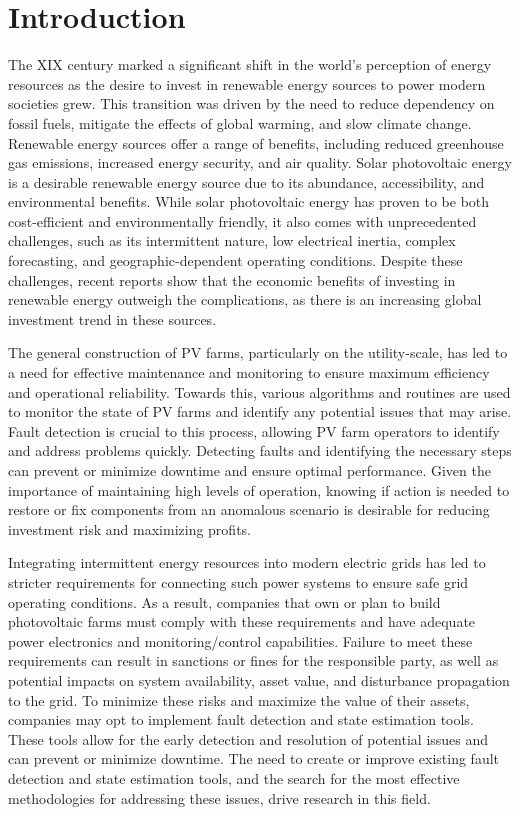 \chapter{Introduction} \label{chap:chap1}


The XIX century marked a significant shift in the world's perception of energy resources as the desire to invest in renewable energy sources to power modern societies grew. This transition was driven by the need to reduce dependency on fossil fuels, mitigate the effects of global warming, and slow climate change. Renewable energy sources offer a range of benefits, including reduced greenhouse gas emissions, increased energy security, and air quality. Solar photovoltaic energy is a desirable renewable energy source due to its abundance, accessibility, and environmental benefits. While solar photovoltaic energy has proven to be both cost-efficient and environmentally friendly, it also comes with unprecedented challenges, such as its intermittent nature, low electrical inertia, complex forecasting, and geographic-dependent operating conditions. Despite these challenges, recent reports \cite{cap} show that the economic benefits of investing in renewable energy outweigh the complications, as there is an increasing global investment trend in these sources.

The general construction of PV farms, particularly on the utility-scale, has led to a need for effective maintenance and monitoring to ensure maximum efficiency and operational reliability. Towards this, various algorithms and routines are used to monitor the state of PV farms and identify any potential issues that may arise. Fault detection is crucial to this process, allowing PV farm operators to identify and address problems quickly. Detecting faults and identifying the necessary steps can prevent or minimize downtime and ensure optimal performance. Given the importance of maintaining high levels of operation, knowing if action is needed to restore or fix components from an anomalous scenario is desirable for reducing investment risk and maximizing profits.

Integrating intermittent energy resources into modern electric grids has led to stricter requirements for connecting such power systems to ensure safe grid operating conditions. As a result, companies that own or plan to build photovoltaic farms must comply with these requirements and have adequate power electronics and monitoring/control capabilities. Failure to meet these requirements can result in sanctions or fines for the responsible party, as well as potential impacts on system availability, asset value, and disturbance propagation to the grid. To minimize these risks and maximize the value of their assets, companies may opt to implement fault detection and state estimation tools. These tools allow for the early detection and resolution of potential issues and can prevent or minimize downtime. The need to create or improve existing fault detection and state estimation tools, and the search for the most effective methodologies for addressing these issues, drive research in this field.

